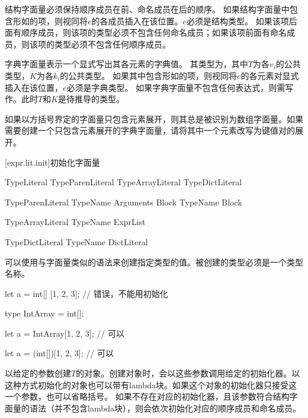 \pnum
结构字面量必须保持顺序成员在前、命名成员在后的顺序。
如果结构字面量中包含形如的项，则视同将$e$的各成员插入在该位置。$e$必须是结构类型。
如果该项后面有顺序成员，则该项的类型必须不包含任何命名成员；如果该项前面有命名成员，则该项的类型必须不包含任何顺序成员。

\pnum
字典字面量\tcode{[$k_1$:$v_1$, $k_2$:$v_2$, $\ldots$, $k_n$:$v_n$]}表示一个显式写出其各元素的字典值。
其类型为，其中$T$为各$v_i$的公共类型，$K$为各$k_i$的公共类型。
如果其中包含形如的项，则视同将$e$的各元素对显式插入在该位置，$e$必须是字典类型。
如果字典字面量不包含任何表达式，则需写作\tcode{[:]}。此时$T$和$K$是待推导的类型。

\pnum
如果以方括号界定的字面量只包含元素展开，则其总是被识别为数组字面量。\enternote 如果需要创建一个只包含元素展开的字典字面量，请将其中一个元素改写为键值对的展开。\exitnote

[expr.lit.init]{初始化字面量}

\begin{bnf}{TypeLiteral}
    TypeParenLiteral \br
    TypeArrayLiteral \br
    TypeDictLiteral
\end{bnf}

\begin{bnf}{TypeParenLiteral}
    TypeName \terminal{(} Arguments\bnfq \terminal{)} Block\bnfq \br
    TypeName Block
\end{bnf}

\begin{bnf}{TypeArrayLiteral}
    TypeName \terminal{[} ExprList\bnfq \terminal{]}
\end{bnf}

\begin{bnf}{TypeDictLiteral}
    TypeName DictLiteral
\end{bnf}

\pnum
可以使用与字面量类似的语法来创建指定类型的值。被创建的类型必须是一个类型名称。

\enterexample
\begin{codeblock}

let a = int[] [1, 2, 3]; // 错误，不能用\tcode{[]}初始化

type IntArray = int[];

let a = IntArray[1, 2, 3]; // 可以

let a = (int[])[1, 2, 3]; // 可以

\end{codeblock}
\exitexample

\pnum
{}以给定的参数创建$T$的对象。创建对象时，会以这些参数调用给定的初始化器。以这种方式初始化的对象也可以带有lambda块。如果这个对象的初始化器只接受这一个参数，也可以省略括号。
如果不存在对应的初始化器，且该参数符合结构字面量的语法（并不包含lambda块），则会依次初始化对应的顺序成员和命名成员。

